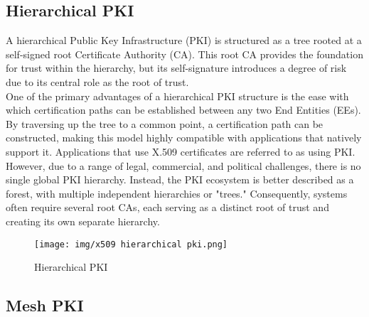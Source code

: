 \subsection{Hierarchical PKI}

A hierarchical Public Key Infrastructure (PKI) is structured as a tree
rooted at a self-signed root Certificate Authority (CA). This root CA
provides the foundation for trust within the hierarchy, but its
self-signature introduces a degree of risk due to its central role as
the root of trust.\\
One of the primary advantages of a hierarchical PKI structure is the
ease with which certification paths can be established between any two
End Entities (EEs). By traversing up the tree to a common point, a
certification path can be constructed, making this model highly
compatible with applications that natively support it. Applications
that use X.509 certificates are referred to as using PKI.\\
However, due to a range of legal, commercial, and political
challenges, there is no single global PKI hierarchy. Instead, the PKI
ecosystem is better described as a forest, with multiple independent
hierarchies or "trees." Consequently, systems often require several
root CAs, each serving as a distinct root of trust and creating its
own separate hierarchy.
\begin{figure}[H]
  \centering
  \texttt{[image: img/x509 hierarchical pki.png]}
  \label{fig:hierarchical PKI}

  \caption{Hierarchical PKI}
\end{figure}

\subsection{Mesh PKI}


